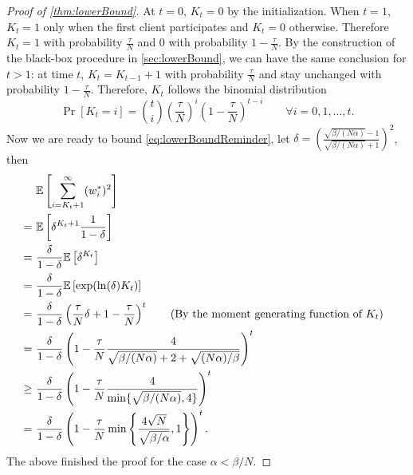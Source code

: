 \begin{proof}[Proof of \autoref{thm:lowerBound}]
    At $t=0$, $K_t = 0$ by the initialization. When $t=1$, $K_t=1$ only when the first client participates and $K_t = 0$ otherwise. Therefore $K_t = 1$ with probability $\frac{\tau}{N}$ and $0$ with probability $1 - \frac{\tau}{N}$. By the construction of the black-box procedure in \autoref{sec:lowerBound}, we can have the same conclusion for $t > 1$: at time $t$, $K_t = K_{t-1}+1$ with probability $\frac{\tau}{N}$ and stay unchanged with probability $1- \frac{\tau}{N}$. Therefore, $K_t$ follows the binomial distribution
    \[
        \Pr[ K_t = i ] = \binom{t}{i} \left( \frac{\tau}{N} \right)^i  \left( 1 - \frac{\tau}{N} \right)^{t-i} \qquad \forall i = 0, 1, \ldots, t.
    \]
    Now we are ready to bound \eqref{eq:lowerBoundReminder}, let $\delta = \left( \frac{\sqrt{ \beta/(N \alpha) } - 1}{ \sqrt{ \beta/(N \alpha) } + 1 } \right)^2 $, then
    \begin{align*}
        & \mathbb{E} \left[ \sum_{i= K_t+1}^{\infty} ( w^*_i )^2 \right] \\
        ~=~& \mathbb{E} \left[ \delta^{K_t + 1} \frac{1}{1 - \delta} \right]  \\
        ~=~& \frac{\delta}{1-\delta} \mathbb{E} \left[ \delta^{K_t} \right]  \\
        ~=~& \frac{\delta}{1-\delta} \mathbb{E} \left[ \exp ( \ln(\delta) K_t ) \right]  \\
        ~=~& \frac{\delta}{1-\delta} \left( \frac{\tau}{N} \delta + 1 -  \frac{\tau}{N} \right)^t \quad  \hbox{\quad(By the moment generating function of $K_t$)\quad} \\
        ~=~& \frac{\delta}{1-\delta} \left( 1 -  \frac{\tau}{N} \frac{4}{ \sqrt{ \beta/(N \alpha) } + 2 + \sqrt{ (N \alpha)/\beta }  } \right)^t \\
        ~\geq~& \frac{\delta}{1-\delta} \left( 1 -  \frac{\tau}{N} \frac{4}{ \min\{ \sqrt{ \beta/(N \alpha) } , 4\} } \right)^t \\
        ~=~& \frac{\delta}{1-\delta} \left( 1 -  \frac{\tau}{N} \min\left\{ \frac{4 \sqrt{N} }{ \sqrt{ \beta/\alpha }  }, 1 \right\} \right)^t.
    \end{align*}
    The above finished the proof for the case $\alpha < \beta/N$.
    

\end{proof}
